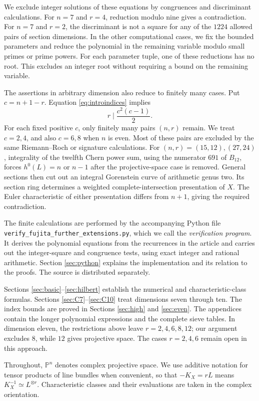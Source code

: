\documentclass[11pt,reqno,letterpaper]{amsart}
\newcommand{\PP}{\mathbb P}
\theoremstyle{definition}
\numberwithin{equation}{section}
\begin{document}
We exclude integer solutions of these equations by congruences and
discriminant calculations. For $n=7$ and $r=4$, reduction modulo nine
gives a contradiction. For $n=7$ and $r=2$, the discriminant is not a
square for any of the $1224$ allowed pairs of section dimensions.
In the other computational cases, we fix the bounded parameters and
reduce the polynomial in the remaining variable modulo small primes or
prime powers. For each parameter tuple, one of these reductions has
no root. This excludes an integer root without requiring a bound on
the remaining variable.

The assertions in arbitrary dimension also reduce to finitely many
cases. Put $c=n+1-r$. Equation \eqref{eq:introindices} implies
\[
 r\mid\frac{c^2(c-1)}2.
\]
For each fixed positive $c$, only finitely many pairs $(n,r)$ remain.
We treat $c=2,4$, and also $c=6,8$ when $n$ is even. Most of these pairs
are excluded by the same Riemann--Roch or signature calculations. For
$(n,r)=(15,12),(27,24)$, integrality of the twelfth Chern power sum,
using the numerator $691$ of $B_{12}$, forces $h^0(L)=n$ or $n-1$ after
the projective-space case is removed. General sections then cut out an
integral Gorenstein curve of arithmetic genus two. Its section ring
determines a weighted complete-intersection presentation of $X$.
The Euler characteristic of either presentation differs from $n+1$,
giving the required contradiction.

The finite calculations are performed by the accompanying Python file
\nolinkurl{verify_fujita_further_extensions.py}, which we call the
\emph{verification program}. It derives the polynomial equations from
the recurrences in the article and carries out the integer-square and
congruence tests, using exact integer and rational arithmetic.
Section \ref{sec:python} explains the implementation and its relation
to the proofs. The source is distributed separately.

Sections \ref{sec:basic}--\ref{sec:hilbert} establish the numerical and
characteristic-class formulas. Sections \ref{sec:C7}--\ref{sec:C10}
treat dimensions seven through ten. The index bounds are proved in
Sections \ref{sec:high} and \ref{sec:even}. The appendices contain the
longer polynomial expressions and the complete sieve tables.
In dimension eleven, the restrictions above leave $r=2,4,6,8,12$;
our argument excludes $8$, while $12$ gives projective space.
The cases $r=2,4,6$ remain open in this approach.

Throughout, $\PP^n$ denotes complex projective space. We use additive
notation for tensor products of line bundles when convenient, so that
$-K_X=rL$ means $K_X^{-1}\simeq L^{\otimes r}$. Characteristic classes
and their evaluations are taken in the complex orientation.
\end{document}
